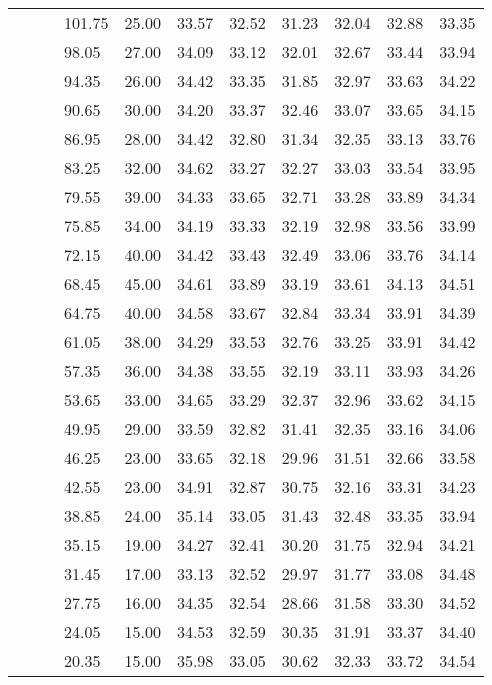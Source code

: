 \begin{longtable}{llllrrrrrrr}
   &  &  & 101.75 & 25.00 & 33.57 & 32.52 & 31.23 & 32.04 & 32.88 & 33.35 \\ 
   &  &  & 98.05 & 27.00 & 34.09 & 33.12 & 32.01 & 32.67 & 33.44 & 33.94 \\ 
   &  &  & 94.35 & 26.00 & 34.42 & 33.35 & 31.85 & 32.97 & 33.63 & 34.22 \\ 
   &  &  & 90.65 & 30.00 & 34.20 & 33.37 & 32.46 & 33.07 & 33.65 & 34.15 \\ 
   &  &  & 86.95 & 28.00 & 34.42 & 32.80 & 31.34 & 32.35 & 33.13 & 33.76 \\ 
   &  &  & 83.25 & 32.00 & 34.62 & 33.27 & 32.27 & 33.03 & 33.54 & 33.95 \\ 
   &  &  & 79.55 & 39.00 & 34.33 & 33.65 & 32.71 & 33.28 & 33.89 & 34.34 \\ 
   &  &  & 75.85 & 34.00 & 34.19 & 33.33 & 32.19 & 32.98 & 33.56 & 33.99 \\ 
   &  &  & 72.15 & 40.00 & 34.42 & 33.43 & 32.49 & 33.06 & 33.76 & 34.14 \\ 
   &  &  & 68.45 & 45.00 & 34.61 & 33.89 & 33.19 & 33.61 & 34.13 & 34.51 \\ 
   &  &  & 64.75 & 40.00 & 34.58 & 33.67 & 32.84 & 33.34 & 33.91 & 34.39 \\ 
   &  &  & 61.05 & 38.00 & 34.29 & 33.53 & 32.76 & 33.25 & 33.91 & 34.42 \\ 
   &  &  & 57.35 & 36.00 & 34.38 & 33.55 & 32.19 & 33.11 & 33.93 & 34.26 \\ 
   &  &  & 53.65 & 33.00 & 34.65 & 33.29 & 32.37 & 32.96 & 33.62 & 34.15 \\ 
   &  &  & 49.95 & 29.00 & 33.59 & 32.82 & 31.41 & 32.35 & 33.16 & 34.06 \\ 
   &  &  & 46.25 & 23.00 & 33.65 & 32.18 & 29.96 & 31.51 & 32.66 & 33.58 \\ 
   &  &  & 42.55 & 23.00 & 34.91 & 32.87 & 30.75 & 32.16 & 33.31 & 34.23 \\ 
   &  &  & 38.85 & 24.00 & 35.14 & 33.05 & 31.43 & 32.48 & 33.35 & 33.94 \\ 
   &  &  & 35.15 & 19.00 & 34.27 & 32.41 & 30.20 & 31.75 & 32.94 & 34.21 \\ 
   &  &  & 31.45 & 17.00 & 33.13 & 32.52 & 29.97 & 31.77 & 33.08 & 34.48 \\ 
   &  &  & 27.75 & 16.00 & 34.35 & 32.54 & 28.66 & 31.58 & 33.30 & 34.52 \\ 
   &  &  & 24.05 & 15.00 & 34.53 & 32.59 & 30.35 & 31.91 & 33.37 & 34.40 \\ 
   &  &  & 20.35 & 15.00 & 35.98 & 33.05 & 30.62 & 32.33 & 33.72 & 34.54 \\ 

\end{longtable}

